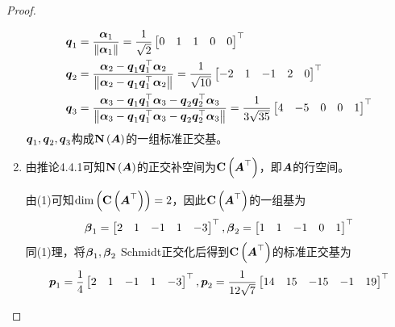 \begin{proof}
\begin{enumerate}
{              \begin{align*}
                  \boldsymbol{q}_1 & =\frac{\boldsymbol{\alpha}_1}{\left\Vert\boldsymbol{\alpha}_1\right\Vert}=\frac{1}{\sqrt2}\begin{bmatrix}0&1&1&0&0\end{bmatrix}^\top                                                                                                                     \\
                  \boldsymbol{q}_2 & =\frac{\boldsymbol{\alpha}_2-\boldsymbol{q}_1\boldsymbol{q}_1^\top\boldsymbol{\alpha}_2}{\left\Vert\boldsymbol{\alpha}_2-\boldsymbol{q}_1\boldsymbol{q}_1^\top\boldsymbol{\alpha}_2\right\Vert}=\frac{1}{\sqrt{10}}\begin{bmatrix}-2&1&-1&2&0\end{bmatrix}^\top                                                          \\
                  \boldsymbol{q}_3 & =\frac{\boldsymbol{\alpha}_3-\boldsymbol{q}_1\boldsymbol{q}_1^\top\boldsymbol{\alpha}_3-\boldsymbol{q}_2\boldsymbol{q}_2^\top\boldsymbol{\alpha}_3}{\left\Vert\boldsymbol{\alpha}_3-\boldsymbol{q}_1\boldsymbol{q}_1^\top\boldsymbol{\alpha}_3-\boldsymbol{q}_2\boldsymbol{q}_2^\top\boldsymbol{\alpha}_3\right\Vert}=\frac{1}{3\sqrt{35}}\begin{bmatrix}4&-5&0&0&1\end{bmatrix}^\top
              \end{align*}
              \(\boldsymbol{q}_1,\boldsymbol{q}_2,\boldsymbol{q}_3\)构成\(\boldsymbol{\mathrm{N}}\left( \boldsymbol{A} \right)\)的一组标准正交基。
              }
        \item {
              由推论4.4.1可知\(\boldsymbol{\mathrm{N}}\left( \boldsymbol{A} \right)\)的正交补空间为\(\boldsymbol{\mathrm{C}}\left( \boldsymbol{A}^\top \right)\)，即\(\boldsymbol{A}\)的行空间。

              由(1)可知\(\dim\left( \boldsymbol{\mathrm{C}}\left( \boldsymbol{A}^\top \right) \right)=2\)，因此\(\boldsymbol{\mathrm{C}}\left( \boldsymbol{A}^\top \right)\)的一组基为
              \begin{equation*}
                  \boldsymbol{\beta}_1=\begin{bmatrix}2&1&-1&1&-3\end{bmatrix}^\top,
                  \boldsymbol{\beta}_2=\begin{bmatrix}1&1&-1&0&1\end{bmatrix}^\top
              \end{equation*}
              同(1)理，将\(\boldsymbol{\beta}_1,\boldsymbol{\beta}_2\) Schmidt正交化后得到\(\boldsymbol{\mathrm{C}}\left( \boldsymbol{A}^\top \right)\)的标准正交基为
              \begin{equation*}
                  \boldsymbol{p}_1=\frac{1}{4}\begin{bmatrix}2&1&-1&1&-3\end{bmatrix}^\top,
                  \boldsymbol{p}_2=\frac{1}{12\sqrt{7}}\begin{bmatrix}14&15&-15&-1&19\end{bmatrix}^\top
              \end{equation*}
              }
    \end{enumerate}
\end{proof}

